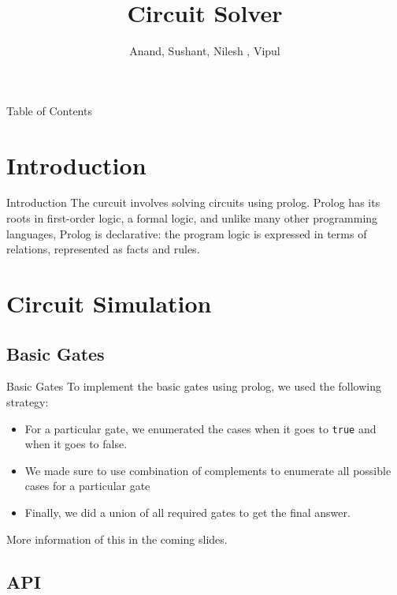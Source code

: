 \documentclass{beamer}
\title[Circuit Solver]{Circuit Solver}
\author{Anand, Sushant, Nilesh , Vipul}
\institute{IIT Bombay}
\begin{document}
\begin{frame}
  \titlepage
\end{frame}

\begin{frame}{Table of Contents}
  \tableofcontents
\end{frame}

\section{Introduction}

\begin{frame}{Introduction}
The curcuit involves solving circuits using prolog.
\vskip 1cm
Prolog has its roots in first-order logic, a formal logic, and unlike many other programming languages, Prolog is declarative: the program logic is expressed in terms of relations, represented as facts and rules.

\end{frame}

\section{Circuit Simulation}

\subsection{Basic Gates}

\begin{frame}{Basic Gates}
To implement the basic gates using prolog, we used the following strategy:
\newline
\begin{itemize}
\item For a particular gate, we enumerated the cases when it goes to \texttt{true} and when it goes to {false}.
\item We made sure to use combination of complements to enumerate all possible cases for a particular gate
\item Finally, we did a union of all required gates to get the final answer.
\end{itemize}
More information of this in the coming slides.
\end{frame}

\subsection{API}
\end{document}
